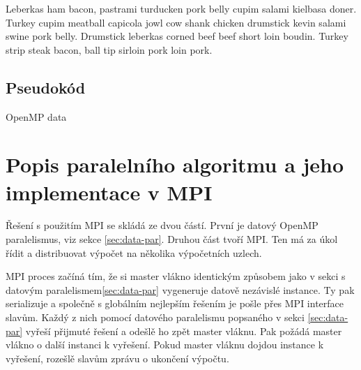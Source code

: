 \documentclass{article}
\begin{document}
    Leberkas ham bacon, pastrami turducken pork belly cupim salami kielbasa doner. Turkey cupim meatball capicola jowl cow shank chicken drumstick kevin salami swine pork belly. Drumstick leberkas corned beef beef short loin boudin. Turkey strip steak bacon, ball tip sirloin pork loin pork.

    \subsection{Pseudokód}

    \begin{algorithm}[H]
        \SetAlgoLined
        \DontPrintSemicolon

        \;
        \caption{OpenMP data}
        \label{alg:openmp-data}
    \end{algorithm}


    \section{Popis paralelního algoritmu a jeho implementace v MPI}

    Řešení s použitím MPI se skládá ze dvou částí. První je datový OpenMP paralelismus,
    viz sekce \ref{sec:data-par}. Druhou část tvoří MPI. Ten má za úkol řídit a distribuovat
    výpočet na několika výpočetních uzlech.

    MPI proces začíná tím, že si master vlákno identickým způsobem jako v sekci s datovým paralelismem\ref{sec:data-par}
    vygeneruje datově nezávislé instance. Ty pak serializuje a společně s globálním nejlepším řešením je
    pošle přes MPI interface slavům. Každý z nich pomocí datového paralelismu popsaného v sekci \ref{sec:data-par}
    vyřeší přijmuté řešení a odešlě ho zpět master vláknu. Pak požádá master vlákno o další instanci k vyřešení.
    Pokud master vláknu dojdou instance k vyřešení, rozešlě slavům zprávu o ukončení výpočtu.
\end{document}
